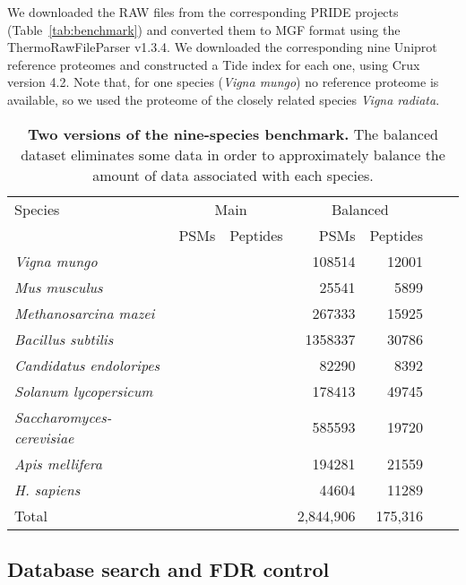 \documentclass{article}
\begin{document}

We downloaded the RAW files from the corresponding PRIDE projects (Table~\ref{tab:benchmark}) and converted them to MGF format using the ThermoRawFileParser v1.3.4.
We downloaded the corresponding nine Uniprot reference proteomes and constructed a Tide index for each one, using Crux version 4.2.
Note that, for one species (\textit{Vigna mungo}) no reference proteome is available, so we used the proteome of the closely related species \textit{Vigna radiata}.

\begin{table}
\scriptsize
\centering
\begin{tabular}{lrrrrrr}
\hline
Species & \multicolumn{2}{c}{Main} & \multicolumn{2}{c}{Balanced} \\
& PSMs & Peptides  & PSMs & Peptides  \\
\hline
\textit{Vigna mungo} & & & 108514 & 12001 \\
\textit{Mus musculus} & & & 25541 & 5899 \\
\textit{Methanosarcina mazei} & & & 267333 & 15925 \\
\textit{Bacillus subtilis} & & & 1358337 & 30786 \\
\textit{Candidatus endoloripes} & & & 82290 & 8392 \\
\textit{Solanum lycopersicum} & & & 178413 & 49745 \\
\textit{Saccharomyces-cerevisiae} & & & 585593 & 19720 \\
\textit{Apis mellifera} & & & 194281 & 21559 \\
\textit{H. sapiens} & & & 44604 & 11289 \\
\hline
Total & & & 2,844,906 & 175,316 \\
\end{tabular}
\caption{{\bf Two versions of the nine-species benchmark.}
  The balanced dataset eliminates some data in order to approximately balance the amount of data associated with each species.
}
\label{tab:sizes}
\end{table}

\subsection*{Database search and FDR control}
\end{document}
